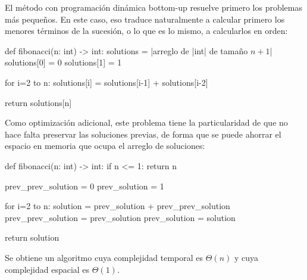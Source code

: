 El método con programación dinámica bottom-up resuelve primero los problemas más pequeños. En este caso, eso traduce naturalmente a calcular primero los menores términos de la sucesión, o lo que es lo mismo, a calcularlos en orden:

\begin{pseudocode}
def fibonacci(n: int) -> int:
    solutions = |\textrm{arreglo de }|int|\textrm{ de tamaño }$n+1$|
    solutions[0] = 0
    solutions[1] = 1

    for i=2 to n:
        solutions[i] = solutions[i-1] + solutions[i-2]

    return solutions[n]
\end{pseudocode}
Como optimización adicional, este problema tiene la particularidad de que no hace falta preservar las soluciones previas, de forma que se puede ahorrar el espacio en memoria que ocupa el arreglo de soluciones:
\begin{pseudocode}
def fibonacci(n: int) -> int:
    if n <= 1: return n

    prev_prev_solution = 0
    prev_solution = 1

    for i=2 to n:
        solution = prev_solution + prev_prev_solution
        prev_prev_solution = prev_solution
        prev_solution = solution

    return solution
\end{pseudocode}
Se obtiene un algoritmo cuya complejidad temporal es $\Theta(n)$ y cuya complejidad espacial es $\Theta(1)$.

